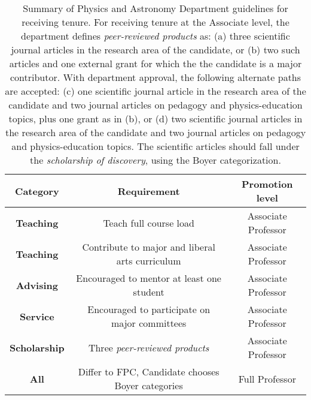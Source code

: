 \documentclass[../../main.tex]{subfiles}
\begin{document}
\begin{table}
\centering
\begin{tabular}{|c|c|c|}
\hline \hline
Category & Requirement & Promotion level \\ \hline
\textbf{Teaching} & Teach full course load & Associate Professor \\ \hline
\textbf{Teaching} & Contribute to major and liberal arts curriculum & Associate Professor \\ \hline
\textbf{Advising} & Encouraged to mentor at least one student & Associate Professor \\ \hline
\textbf{Service} & Encouraged to participate on major committees & Associate Professor \\ \hline
\textbf{Scholarship} & Three \textit{peer-reviewed products} & Associate Professor \\ \hline \hline
\textbf{All} & Differ to FPC, Candidate chooses Boyer categories & Full Professor \\ \hline
\end{tabular}
\caption{\label{tab:tenure} Summary of Physics and Astronomy Department guidelines for receiving tenure.  For receiving tenure at the Associate level, the department defines \textit{peer-reviewed products} as: (a) three scientific journal articles in the research area of the candidate, or (b) two such articles and one external grant for which the the candidate is a major contributor.  With department approval, the following alternate paths are accepted: (c) one scientific journal article in the research area of the candidate and two journal articles on pedagogy and physics-education topics, plus one grant as in (b), or (d) two scientific journal articles in the research area of the candidate and two journal articles on pedagogy and physics-education topics.  The scientific articles should fall under the \textit{scholarship of discovery}, using the Boyer categorization.}
\end{table}
\end{document}
